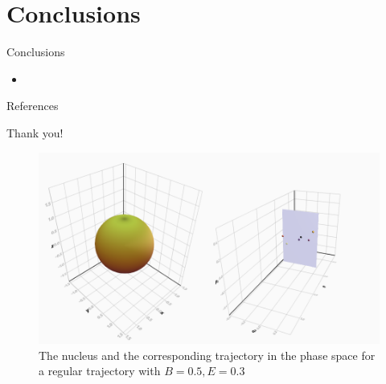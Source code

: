 \documentclass{beamer}
\begin{document}

\section{Conclusions}

\begin{frame}{Conclusions}
	\begin{itemize}
		\item
	\end{itemize}
\end{frame}


\begin{frame}[allowframebreaks]{References}


\end{frame}


\begin{frame}[standout]
Thank you!
\end{frame}

\appendix


\begin{frame}
	\begin{figure}
		\includegraphics[width=\textwidth]{nucleus-with-poincare}
		\caption{The nucleus and the corresponding trajectory in the phase space
		for a regular trajectory with \(B=0.5, E=0.3\)}
	\end{figure}
\end{frame}
\end{document}
